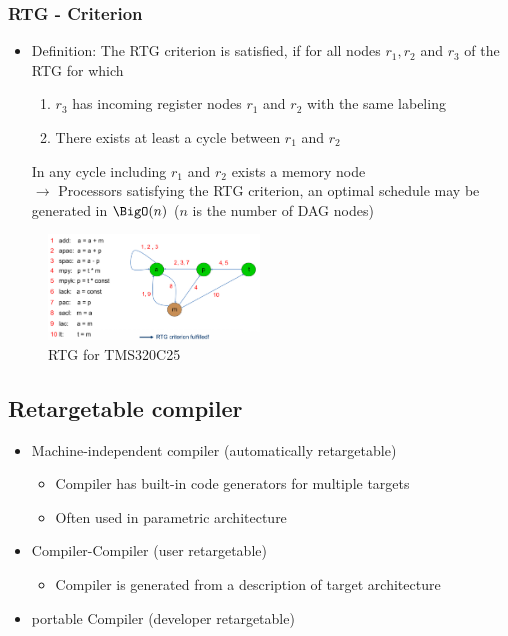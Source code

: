 \subsubsection{RTG - Criterion}
\begin{itemize}
	\item Definition: The RTG criterion is satisfied, if for all nodes $r_1, r_2$ and $r_3$ of the RTG for which
\begin{enumerate}
  \item $r_3$ has incoming register nodes $r_1$ and $r_2$ with the same labeling
  \item There exists at least a cycle between $r_1$ and $r_2$
\end{enumerate}
In any cycle including $r_1$ and $r_2$ exists a memory node \\
$\rightarrow$ Processors satisfying the RTG criterion, an optimal schedule may be generated in $\BigO(n)$ ($n$ is the number of DAG nodes)
\end{itemize}

\begin{figure}[h]
	\begin{center}
		\includegraphics[width=0.5\textwidth]{images/RTG_criterrion.png}
		\caption{RTG for TMS320C25}
		\label{fig:RTG}
	\end{center}
\end{figure}

\subsection{Retargetable compiler}
\begin{itemize}
	\item Machine-independent compiler (automatically retargetable)
\begin{itemize}
	\item Compiler has built-in code generators for multiple targets
	\item Often used in parametric architecture 
\end{itemize}
	\item Compiler-Compiler (user retargetable)
\begin{itemize}
	\item Compiler is generated from a description of target architecture
\end{itemize}
	\item portable Compiler (developer retargetable)
\end{itemize}

